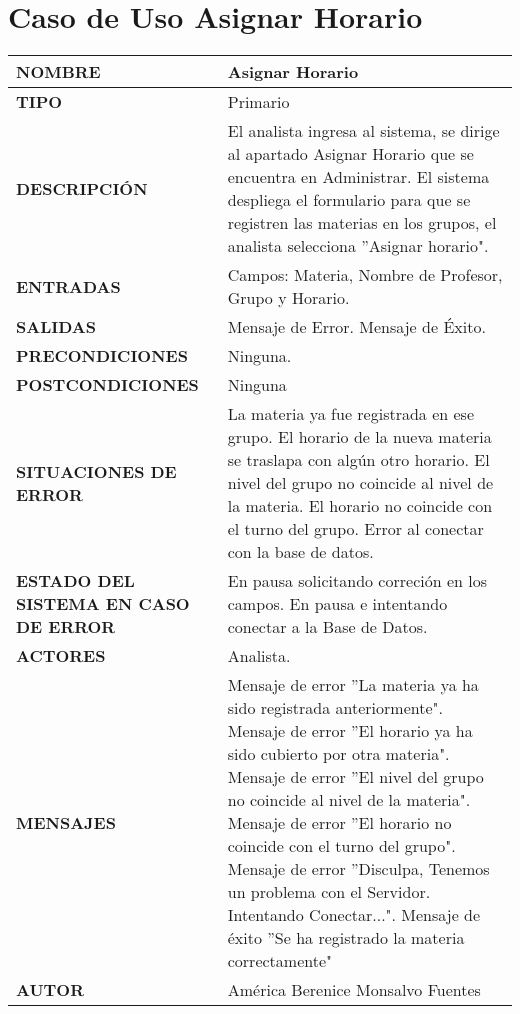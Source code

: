 \section{Caso de Uso Asignar Horario}
\begin{longtable}{ | p{6cm} | p{10cm} |}
	\hline
	\textbf{NOMBRE}
	&
	Asignar Horario\\
	\hline
	\textbf{TIPO}
	&
	Primario\\
	\hline
	\textbf{DESCRIPCIÓN}
	&
	El analista ingresa al sistema, se dirige al apartado Asignar Horario que se encuentra en Administrar. El sistema despliega el formulario para que se registren las materias en los grupos, el analista selecciona ''Asignar horario".\\
	\hline
	\textbf{ENTRADAS}
	&
	Campos: Materia, Nombre de Profesor, Grupo y Horario.\\
	\hline
	\textbf{SALIDAS}
	&
	Mensaje de Error.\newline
	Mensaje de Éxito.\\
	\hline
	\textbf{PRECONDICIONES}
	&
	Ninguna.\\
	\hline
	\textbf{POSTCONDICIONES}
	&
	Ninguna\\
	\hline
	\textbf{SITUACIONES DE ERROR}
	&
	La materia ya fue registrada en ese grupo.\newline
	El horario de la nueva materia se traslapa con algún otro horario.\newline
	El nivel del grupo no coincide al nivel de la materia.\newline
	El horario no coincide con el turno del grupo.\newline
	Error al conectar con la base de datos.\\
	\hline
	\textbf{ESTADO DEL SISTEMA EN CASO DE ERROR}
	&
	En pausa solicitando correción en los campos.\newline
	En pausa e intentando conectar a la Base de Datos.\\
	\hline
	\textbf{ACTORES}
	&
	Analista.\\
	\hline
	\textbf{MENSAJES}
	&
	Mensaje de error ''La materia ya ha sido registrada anteriormente".\newline
	Mensaje de error ''El horario ya ha sido cubierto por otra materia".\newline
	Mensaje de error ''El nivel del grupo no coincide al nivel de la materia".\newline
	Mensaje de error ''El horario no coincide con el turno del grupo".\newline
	Mensaje de error ''Disculpa, Tenemos un problema con el Servidor. Intentando Conectar...".\newline
	Mensaje de éxito ''Se ha registrado la materia correctamente"\\
	\hline
	\textbf{AUTOR}
	&
	América Berenice Monsalvo Fuentes\\
	\hline
\end{longtable}
